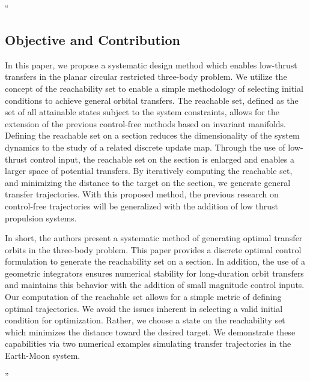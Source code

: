 \documentclass[11pt]{article}
\newenvironment{correction}{\begin{list}{}{\setlength{\leftmargin}{1cm}\setlength{\rightmargin}{1cm}}\vspace{\parsep}\item[]``}{''\end{list}}
\begin{document}
\begin{itemize}
\begin{correction}
            \subsection{Objective and Contribution}
            In this paper, we propose a systematic design method which enables low-thrust transfers in the planar circular restricted three-body problem.
            We utilize the concept of the reachability set to enable a simple methodology of selecting initial conditions to achieve general orbital transfers. 
            The reachable set, defined as the set of all attainable states subject to the system constraints, allows for the extension of the previous control-free methods based on invariant manifolds.
            Defining the reachable set on a \Poincare section reduces the dimensionality of the system dynamics to the study of a related discrete update map.
            Through the use of low-thrust control input, the reachable set on the \Poincare section is enlarged and enables a larger space of potential transfers.
            By iteratively computing the reachable set, and minimizing the distance to the target on the \Poincare section, we generate general transfer trajectories.
            With this proposed method, the previous research on control-free trajectories will be generalized with the addition of low thrust propulsion systems.

            In short, the authors present a systematic method of generating optimal transfer orbits in the three-body problem.
            This paper provides a discrete optimal control formulation to generate the reachability set on a \Poincare section.
            In addition, the use of a geometric integrators ensures numerical stability for long-duration orbit transfers and maintains this behavior with the addition of small magnitude control inputs.
            Our computation of the reachable set allows for a simple metric of defining optimal trajectories.
            We avoid the issues inherent in selecting a valid initial condition for optimization.
            Rather, we choose a state on the reachability set which minimizes the distance toward the desired target.
            We demonstrate these capabilities via two numerical examples simulating transfer trajectories in the Earth-Moon system.

        \end{correction}
\end{itemize}
\end{document}
